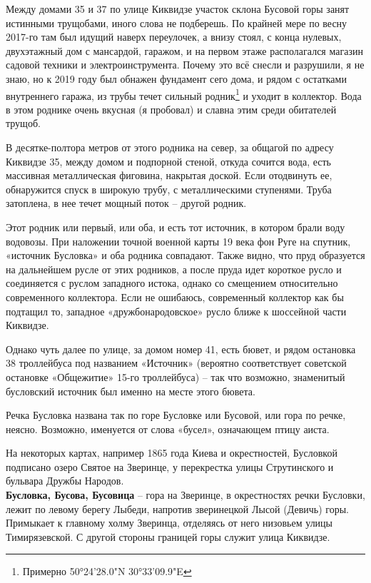 Между домами 35 и 37 по улице Киквидзе участок склона Бусовой горы занят истинными трущобами, иного слова не подберешь. По крайней мере по весну 2017-го там был идущий наверх переулочек, а внизу стоял, с конца нулевых, двухэтажный дом с мансардой, гаражом, и на первом этаже располагался магазин садовой техники и электроинструмента. Почему это всё снесли и разрушили, я не знаю, но к 2019 году был обнажен фундамент сего дома, и рядом с остатками внутреннего гаража, из трубы течет сильный родник\footnote{Примерно 50°24'28.0"N 30°33'09.9"E} и уходит в коллектор. Вода в этом роднике очень вкусная (я пробовал) и славна этим среди обитателей трущоб.

В десятке-полтора метров от этого родника на север, за общагой по адресу Киквидзе 35, между домом и подпорной стеной, откуда сочится вода, есть массивная металлическая фиговина, накрытая доской. Если отодвинуть ее, обнаружится спуск в широкую трубу, с металлическими ступенями. Труба затоплена, в нее течет мощный поток – другой родник.

Этот родник или первый, или оба, и есть тот источник, в котором брали воду водовозы. При наложении точной военной карты 19 века фон Руге на спутник, «источник Бусловка» и оба родника совпадают. Также видно, что пруд образуется на дальнейшем русле от этих родников, а после пруда идет короткое русло и соединяется с руслом западного истока, однако со смещением относительно современного коллектора. Если не ошибаюсь, современный коллектор как бы подтащил то, западное «дружбонародовское» русло ближе к шоссейной части Киквидзе.

Однако чуть далее по улице, за домом номер 41, есть бювет, и рядом остановка 38 троллейбуса под названием «Источник» (вероятно соответствует советской остановке «Общежитие» 15-го троллейбуса) – так что возможно, знаменитый бусловский источник был именно на месте этого бювета.

Речка Бусловка названа так по горе Бусловке или Бусовой, или гора по речке, неясно. Возможно, именуется от слова «бусел», означающем птицу аиста.

На некоторых картах, например 1865 года Киева и окрестностей, Бусловкой подписано озеро Святое на Зверинце, у перекрестка улицы Струтинского и бульвара Дружбы Народов.\\

\textbf{Бусловка, Бусова, Бусовица} – гора на Зверинце, в окрестностях речки Бусловки, лежит по левому берегу Лыбеди, напротив зверинецкой Лысой (Девичь) горы. Примыкает к главному холму Зверинца, отделяясь от него низовьем улицы Тимирязевской. С другой стороны границей горы служит улица Киквидзе. 

